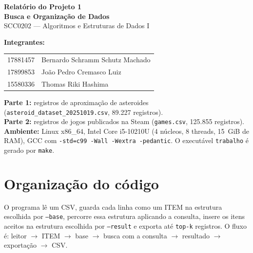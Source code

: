 \documentclass[11pt,a4paper]{article}
\begin{document}
\begin{center}
  {\LARGE\bfseries Relatório do Projeto 1}\\[0.3em]
  {\large\bfseries Busca e Organização de Dados}\\[0.3em]
  SCC0202 --- Algoritmos e Estruturas de Dados I
\end{center}

\noindent\textbf{Integrantes:} \\[0.3em]
\begin{tabular}{r @{ -- } l}
    17881457 & Bernardo Schramm Schutz Machado \\
    17899853 & João Pedro Cremasco Luiz \\
    15580336 & Thomas Riki Hashima
\end{tabular}

\vspace{0.8em} %

\noindent\textbf{Parte 1:} registros de aproximação de asteroides (\texttt{asteroid\_dataset\_20251019.csv}, 89.227 registros). \\
\textbf{Parte 2:} registros de jogos publicados na Steam (\texttt{games.csv}, 125.855 registros). \\
\textbf{Ambiente:} Linux x86\_64, Intel Core i5-10210U (4 núcleos, 8 threads, 15~GiB de RAM), GCC com \texttt{-std=c99 -Wall -Wextra -pedantic}. O executável \texttt{trabalho} é gerado por \texttt{make}.

\section{Organização do código}

O programa lê um CSV, guarda cada linha como um ITEM na estrutura escolhida por \texttt{--base}, percorre essa estrutura aplicando a consulta, insere os itens aceitos na estrutura escolhida por \texttt{--result} e exporta até \texttt{top-k} registros. O fluxo é: leitor $\rightarrow$ ITEM $\rightarrow$ base $\rightarrow$ busca com a consulta $\rightarrow$ resultado $\rightarrow$ exportação $\rightarrow$ CSV.
\end{document}
